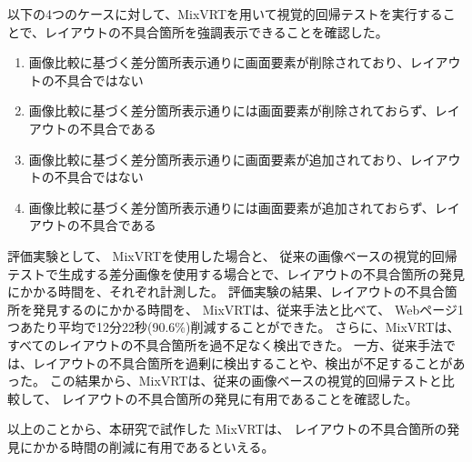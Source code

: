 \documentclass[uplatex, report, a4j, 10pt]{jsbook}
\newcommand{\toolName}{MixVRT}  %
\begin{document}
\par
以下の4つのケースに対して、\toolName を用いて視覚的回帰テストを実行することで、レイアウトの不具合箇所を強調表示できることを確認した。
\begin{enumerate}[label=ケース\arabic*., leftmargin=1.8cm]
      \setlength{\itemsep}{0pt}
            \setlength{\parsep}{0pt}
      \item 画像比較に基づく差分箇所表示通りに画面要素が削除されており、レイアウトの不具合ではない
      \item 画像比較に基づく差分箇所表示通りには画面要素が削除されておらず、レイアウトの不具合である
      \item 画像比較に基づく差分箇所表示通りに画面要素が追加されており、レイアウトの不具合ではない
      \item 画像比較に基づく差分箇所表示通りには画面要素が追加されておらず、レイアウトの不具合である
\end{enumerate}
\par
評価実験として、
\toolName を使用した場合と、
従来の画像ベースの視覚的回帰テストで生成する差分画像を使用する場合とで、レイアウトの不具合箇所の発見にかかる時間を、それぞれ計測した。
評価実験の結果、レイアウトの不具合箇所を発見するのにかかる時間を、
\toolName は、従来手法と比べて、
Webページ1つあたり平均で12分22秒(90.6\%)削減することができた。
さらに、\toolName は、すべてのレイアウトの不具合箇所を過不足なく検出できた。
一方、従来手法では、レイアウトの不具合箇所を過剰に検出することや、検出が不足することがあった。
この結果から、\toolName は、従来の画像ベースの視覚的回帰テストと比較して、
レイアウトの不具合箇所の発見に有用であることを確認した。
\par
以上のことから、本研究で試作した \toolName は、
レイアウトの不具合箇所の発見にかかる時間の削減に有用であるといえる。


%
% 








%


%

\end{document}
